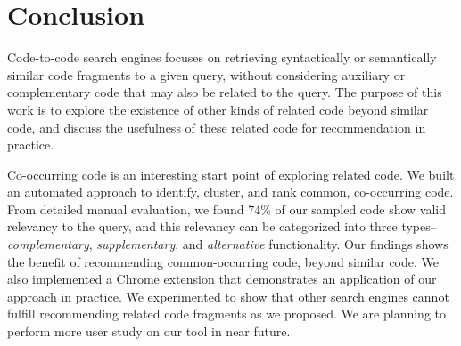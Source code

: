 \documentclass[conference]{IEEEtran}
\newcommand{\ttt}[1]{\tt\small{#1}}
\newcommand{\tool}{{\ttt CodeAid}}
\begin{document}
\section{Conclusion}
\label{sec:conclude}

Code-to-code search engines focuses on retrieving syntactically or semantically similar code fragments to a given query, without considering auxiliary or complementary code that may also be related to the query. The purpose of this work is to explore the existence of other kinds of related code beyond similar code, and discuss the usefulness of these related code for recommendation in practice.

Co-occurring code is an interesting start point of exploring related code. We built an automated approach to identify, cluster, and rank common, co-occurring code. From detailed manual evaluation, we found 74\% of our sampled code show valid relevancy to the query, and this relevancy can be categorized into three types--{\em complementary}, {\em supplementary}, and {\em alternative} functionality. Our findings shows the benefit of recommending common-occurring code, beyond similar code. We also implemented a Chrome extension that demonstrates an application of our approach in practice. We experimented to show that other search engines cannot fulfill recommending related code fragments as we proposed. We are planning to perform more user study on our tool in near future.








\end{document}

